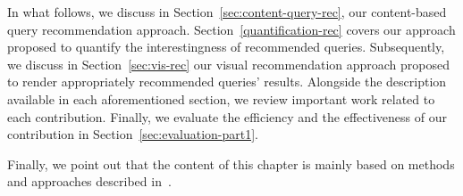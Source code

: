 


In what follows, we discuss in Section~\ref{sec:content-query-rec}, our content-based query recommendation approach. Section~\ref{quantification-rec} covers our approach proposed to quantify the interestingness of recommended queries. Subsequently, we discuss in Section~\ref{sec:vis-rec} our visual recommendation approach proposed to render appropriately recommended queries' results. 
Alongside the description available in each aforementioned section, we review important work related to each contribution.
{\color{Fuchsia}Finally, we evaluate the efficiency and the effectiveness of our contribution in Section~\ref{sec:evaluation-part1}.}

Finally, we point out that the content of this chapter is mainly based on methods and approaches described in~\cite{Houssem:17:tapp,BHBK18:Demo}.


